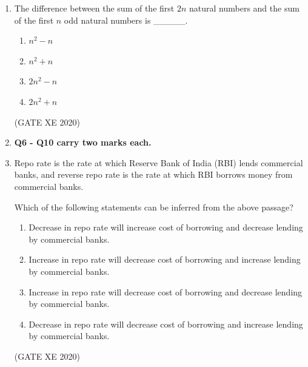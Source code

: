 \documentclass[12pt]{article}
\begin{document}
\begin{enumerate}
Which of the following statements can be inferred from the given passage?

\begin{enumerate}
\item Officials declared that the food-grain production target will be met due to good rains.
\item Officials want the food-grain production target to be met by the November--February period.
\item Officials feel that the food-grain production target cannot be met due to floods.
\item Officials hope that the food-grain production target will be met due to a good rabi produce.
\end{enumerate}
(GATE XE 2020)

\item The difference between the sum of the first $2n$ natural numbers and the sum of the first $n$ odd natural numbers is \_\_\_\_\_.

\begin{enumerate}
\item $n^2 - n$
\item $n^2 + n$
\item $2n^2 - n$
\item $2n^2 + n$
\end{enumerate}
(GATE XE 2020)

\item[] \textbf{Q6 - Q10 carry two marks each.}

\item Repo rate is the rate at which Reserve Bank of India (RBI) lends commercial banks, and reverse repo rate is the rate at which RBI borrows money from commercial banks.  

Which of the following statements can be inferred from the above passage?  

\begin{enumerate}
\item Decrease in repo rate will increase cost of borrowing and decrease lending by commercial banks.
\item Increase in repo rate will decrease cost of borrowing and increase lending by commercial banks.
\item Increase in repo rate will decrease cost of borrowing and decrease lending by commercial banks.
\item Decrease in repo rate will decrease cost of borrowing and increase lending by commercial banks.
\end{enumerate}
(GATE XE 2020)


\end{enumerate}
\end{document}
